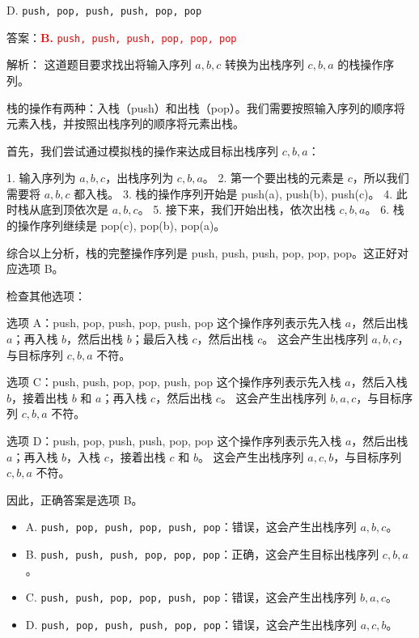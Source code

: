\documentclass[lang=cn,newtx,10pt,scheme=chinese]{../../../elegantbook}
\begin{document}
\begin{enumerate}
    D. \texttt{push, pop, push, push, pop, pop}  

    答案：\textcolor{red}{\textbf{B.} \texttt{push, push, push, pop, pop, pop}}

    解析：
    这道题目要求找出将输入序列 $a, b, c$ 转换为出栈序列 $c, b, a$ 的栈操作序列。

    栈的操作有两种：入栈（push）和出栈（pop）。我们需要按照输入序列的顺序将元素入栈，并按照出栈序列的顺序将元素出栈。

    首先，我们尝试通过模拟栈的操作来达成目标出栈序列 $c, b, a$：

    1. 输入序列为 $a, b, c$，出栈序列为 $c, b, a$。
    2. 第一个要出栈的元素是 $c$，所以我们需要将 $a, b, c$ 都入栈。
    3. 栈的操作序列开始是 push(a), push(b), push(c)。
    4. 此时栈从底到顶依次是 $a, b, c$。
    5. 接下来，我们开始出栈，依次出栈 $c, b, a$。
    6. 栈的操作序列继续是 pop(c), pop(b), pop(a)。

    综合以上分析，栈的完整操作序列是 push, push, push, pop, pop, pop。这正好对应选项 B。

    检查其他选项：
    
    选项 A：push, pop, push, pop, push, pop
    这个操作序列表示先入栈 $a$，然后出栈 $a$；再入栈 $b$，然后出栈 $b$；最后入栈 $c$，然后出栈 $c$。
    这会产生出栈序列 $a, b, c$，与目标序列 $c, b, a$ 不符。

    选项 C：push, push, pop, pop, push, pop
    这个操作序列表示先入栈 $a$，然后入栈 $b$，接着出栈 $b$ 和 $a$；再入栈 $c$，然后出栈 $c$。
    这会产生出栈序列 $b, a, c$，与目标序列 $c, b, a$ 不符。

    选项 D：push, pop, push, push, pop, pop
    这个操作序列表示先入栈 $a$，然后出栈 $a$；再入栈 $b$，入栈 $c$，接着出栈 $c$ 和 $b$。
    这会产生出栈序列 $a, c, b$，与目标序列 $c, b, a$ 不符。

    因此，正确答案是选项 B。

    \begin{itemize}
        \item A. \texttt{push, pop, push, pop, push, pop}：错误，这会产生出栈序列 $a, b, c$。
        \item B. \texttt{push, push, push, pop, pop, pop}：正确，这会产生目标出栈序列 $c, b, a$。
        \item C. \texttt{push, push, pop, pop, push, pop}：错误，这会产生出栈序列 $b, a, c$。
        \item D. \texttt{push, pop, push, push, pop, pop}：错误，这会产生出栈序列 $a, c, b$。
    \end{itemize}


\end{enumerate}
\end{document}
